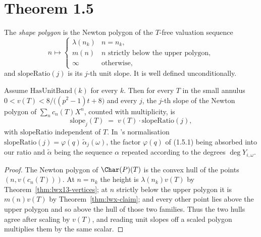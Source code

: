 \section{Theorem 1.5}

\begin{definition}
  \label{def:shapepolygon}
  \leanok
  The \emph{shape polygon} is the Newton polygon of the $T$-free valuation sequence
  \[
    n \longmapsto
    \begin{cases}
      \lambda(n_k) & n = n_k, \\
      m(n) & n \text{ strictly below the upper polygon}, \\
      \infty & \text{otherwise},
    \end{cases}
  \]
  and $\mathrm{slopeRatio}(j)$ is its $j$-th unit slope.  It is well defined unconditionally.
\end{definition}

\begin{theorem}
  \label{thm:lwx15}
  \leanok
  Assume $\mathrm{HasUnitBand}(k)$ for every $k$.  Then for every $T$ in the small annulus
  $0 < v(T) < 8/\bigl((p^{2}-1)t+8\bigr)$ and every $j$, the $j$-th slope of the Newton polygon
  of $\sum_n c_n(T)X^{n}$, counted with multiplicity, is
  \[
    \mathrm{slope}_j(T) \;=\; v(T)\cdot\mathrm{slopeRatio}(j),
  \]
  with $\mathrm{slopeRatio}$ independent of $T$.  In \cite{LWX}'s normalisation
  $\mathrm{slopeRatio}(j) = \varphi(q)\,\tilde\alpha_j(\omega)$, the factor $\varphi(q)$ of
  (1.5.1) being absorbed into our ratio and $\tilde\alpha$ being the sequence $\alpha$ repeated
  according to the degrees $\deg Y_{i,\omega}$.
\end{theorem}

\begin{proof}
  \leanok
  The Newton polygon of $\Char(P)(T)$ is the convex hull of the points $(n, v(c_n(T)))$.  At
  $n = n_k$ the height is $\lambda(n_k)v(T)$ by Theorem~\ref{thm:lwx13-vertices}; at $n$ strictly
  below the upper polygon it is $m(n)v(T)$ by Theorem~\ref{thm:lwx-claim}; and every other point
  lies above the upper polygon and so above the hull of those two families.  Thus the two hulls
  agree after scaling by $v(T)$, and reading unit slopes off a scaled polygon multiplies them by
  the same scalar.
\end{proof}

